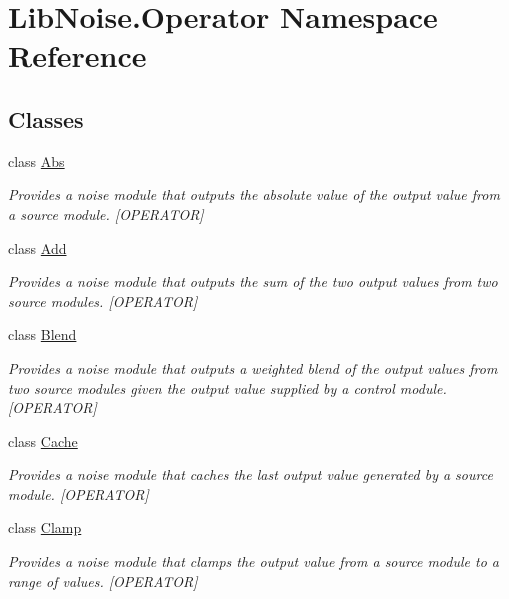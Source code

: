 \hypertarget{namespace_lib_noise_1_1_operator}{}\section{Lib\+Noise.\+Operator Namespace Reference}
\label{namespace_lib_noise_1_1_operator}
\subsection*{Classes}
\begin{DoxyCompactItemize}
\item 
class \hyperlink{class_lib_noise_1_1_operator_1_1_abs}{Abs}
\begin{DoxyCompactList}\small\item\em Provides a noise module that outputs the absolute value of the output value from a source module. \mbox{[}O\+P\+E\+R\+A\+T\+OR\mbox{]} \end{DoxyCompactList}\item 
class \hyperlink{class_lib_noise_1_1_operator_1_1_add}{Add}
\begin{DoxyCompactList}\small\item\em Provides a noise module that outputs the sum of the two output values from two source modules. \mbox{[}O\+P\+E\+R\+A\+T\+OR\mbox{]} \end{DoxyCompactList}\item 
class \hyperlink{class_lib_noise_1_1_operator_1_1_blend}{Blend}
\begin{DoxyCompactList}\small\item\em Provides a noise module that outputs a weighted blend of the output values from two source modules given the output value supplied by a control module. \mbox{[}O\+P\+E\+R\+A\+T\+OR\mbox{]} \end{DoxyCompactList}\item 
class \hyperlink{class_lib_noise_1_1_operator_1_1_cache}{Cache}
\begin{DoxyCompactList}\small\item\em Provides a noise module that caches the last output value generated by a source module. \mbox{[}O\+P\+E\+R\+A\+T\+OR\mbox{]} \end{DoxyCompactList}\item 
class \hyperlink{class_lib_noise_1_1_operator_1_1_clamp}{Clamp}
\begin{DoxyCompactList}\small\item\em Provides a noise module that clamps the output value from a source module to a range of values. \mbox{[}O\+P\+E\+R\+A\+T\+OR\mbox{]} \end{DoxyCompactList}\item 

\end{DoxyCompactItemize}

